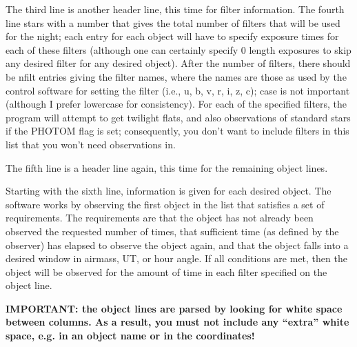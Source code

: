 The third line is another header line, this time for filter information. The
fourth line stars with a number that gives the total number of filters that 
will be used for the night; each entry for each object will have to specify
exposure times for each of these filters (although one can certainly specify
0 length exposures to skip any desired filter for any desired object). After
the number of filters, there should be nfilt entries giving the filter names,
where the names are those as used by the control software for setting the
filter (i.e., u, b, v, r, i, z, c); case is not important (although I prefer
lowercase for consistency). For each of
the specified filters, the program will attempt to get twilight flats, 
and also observations of standard stars if the PHOTOM flag is set; 
consequently, you don't want to include filters in this list that you
won't need observations in.

The fifth line is a header line again, this time for the remaining object lines.

Starting with the sixth line, information is given for each desired
object.  The software works by observing the first object in the list that
satisfies a set of requirements. The requirements are that the object has
not already been observed the requested number of times, that sufficient
time (as defined by the observer) has elapsed to observe the object again,
and that the object falls into a desired window in airmass, UT, or hour
angle. If all conditions are met, then the object will be observed for
the amount of time in each filter specified on the object line.

\textbf{IMPORTANT: the object lines are parsed by looking for white space
between columns. As a result, you must not include any ``extra'' white space,
e.g. in an object name or in the coordinates!}

